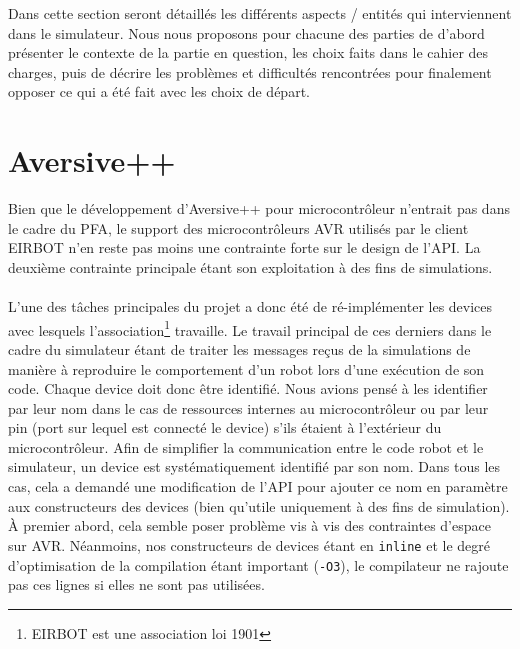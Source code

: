 \label{detail}

Dans cette section seront détaillés les différents aspects / entités qui interviennent dans le simulateur. Nous nous proposons pour chacune des parties de d'abord présenter le contexte de la partie en question, les choix faits dans le cahier des charges, puis de décrire les problèmes et difficultés rencontrées pour finalement opposer ce qui a été fait avec les choix de départ.

\section{Aversive++}

Bien que le développement d'Aversive++ pour microcontrôleur n'entrait pas dans le cadre du PFA, le support des microcontrôleurs AVR utilisés par le client EIRBOT n'en reste pas moins une contrainte forte sur le design de l'API. La deuxième contrainte principale étant son exploitation à des fins de simulations.

\paragraph{} %

L'une des tâches principales du projet a donc été de ré-implémenter les devices avec lesquels l'association\footnote{EIRBOT est une association loi 1901} travaille. Le travail principal de ces derniers dans le cadre du simulateur étant de traiter les messages reçus de la simulations de manière à reproduire le comportement d'un robot lors d'une exécution de son code. Chaque device doit donc être identifié. Nous avions pensé à les identifier par leur nom dans le cas de ressources internes au microcontrôleur ou par leur pin (port sur lequel est connecté le device) s'ils étaient à l'extérieur du microcontrôleur. Afin de simplifier la communication entre le code robot et le simulateur, un device est systématiquement identifié par son nom. Dans tous les cas, cela a demandé une modification de l'API pour ajouter ce nom en paramètre aux constructeurs des devices (bien qu'utile uniquement à des fins de simulation). À premier abord, cela semble poser problème vis à vis des contraintes d'espace sur AVR. Néanmoins, nos constructeurs de devices étant en \texttt{inline} et le degré d'optimisation de la compilation étant important (\texttt{-O3}), le compilateur ne rajoute pas ces lignes si elles ne sont pas utilisées.

